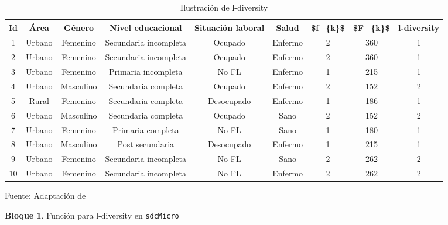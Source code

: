 \documentclass[]{book}
\newenvironment{Shaded}{\begin{snugshade}}{\end{snugshade}}
\newcommand{\CommentTok}[1]{\textcolor[rgb]{0.56,0.35,0.01}{\textit{#1}}}
\newcommand{\DataTypeTok}[1]{\textcolor[rgb]{0.13,0.29,0.53}{#1}}
\newcommand{\DecValTok}[1]{\textcolor[rgb]{0.00,0.00,0.81}{#1}}
\newcommand{\KeywordTok}[1]{\textcolor[rgb]{0.13,0.29,0.53}{\textbf{#1}}}
\newcommand{\NormalTok}[1]{#1}
\newcommand{\OperatorTok}[1]{\textcolor[rgb]{0.81,0.36,0.00}{\textbf{#1}}}
\newcommand{\OtherTok}[1]{\textcolor[rgb]{0.56,0.35,0.01}{#1}}
\newcommand{\StringTok}[1]{\textcolor[rgb]{0.31,0.60,0.02}{#1}}
\theoremstyle{definition}
\theoremstyle{definition}
\newtheorem{example}{Bloque}[chapter]
\theoremstyle{definition}
\theoremstyle{definition}
\theoremstyle{remark}
\begin{document}
\begin{table}

\caption{\label{tab:tabMR3}Ilustración de l-diversity}
\centering
\begin{tabular}[t]{c|c|c|c|c|c|c|c|c}
\hline
Id & Área & Género & Nivel educacional & Situación laboral & Salud & \$f\_\{k\}\$ & \$F\_\{k\}\$  & l-diversity\\
\hline
1 & Urbano & Femenino & Secundaria incompleta & Ocupado & Enfermo & 2 & 360 & 1\\
\hline
2 & Urbano & Femenino & Secundaria incompleta & Ocupado & Enfermo & 2 & 360 & 1\\
\hline
3 & Urbano & Femenino & Primaria incompleta & No FL & Enfermo & 1 & 215 & 1\\
\hline
4 & Urbano & Masculino & Secundaria completa & Ocupado & Enfermo & 2 & 152 & 2\\
\hline
5 & Rural & Femenino & Secundaria completa & Desocupado & Enfermo & 1 & 186 & 1\\
\hline
6 & Urbano & Masculino & Secundaria completa & Ocupado & Sano & 2 & 152 & 2\\
\hline
7 & Urbano & Femenino & Primaria completa & No FL & Sano & 1 & 180 & 1\\
\hline
8 & Urbano & Masculino & Post secundaria & Desocupado & Enfermo & 1 & 215 & 1\\
\hline
9 & Urbano & Femenino & Secundaria incompleta & No FL & Sano & 2 & 262 & 2\\
\hline
10 & Urbano & Femenino & Secundaria incompleta & No FL & Enfermo & 2 & 262 & 2\\
\hline
\end{tabular}
\end{table}

Fuente: Adaptación de \citep[p.33]{benschop}

\begin{example}
\protect\hypertarget{exm:bloqueMR6}{}{\label{exm:bloqueMR6} }Función para l-diversity en \texttt{sdcMicro}
\end{example}

\begin{Shaded}
\end{Shaded}
\end{document}
